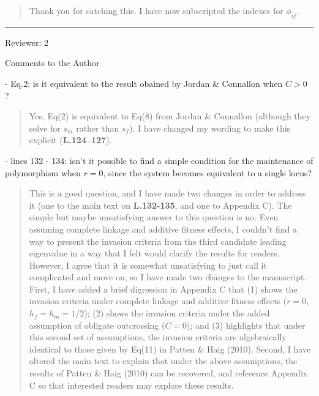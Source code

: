 \documentclass[11pt]{article}
\begin{document}
	\begin{quote}
		Thank you for catching this. I have now subscripted the indexes for $\phi_{ij}$.
	\end{quote}



\bigskip
\noindent \rule{8cm}{0.4pt}
\bigskip



\noindent Reviewer: 2
\bigskip

\noindent Comments to the Author
\bigskip

 - Eq.2: is it equivalent to the result obained by Jordan \& Connallon when $C > 0$ ?

	\begin{quote}
		Yes, Eq(2) is equivalent to Eq(8) from Jordan \& Connallon (although they solve for $s_m$ rather than $s_f$). I have changed my wording to make this explicit (\textbf{L.124--127}).
	\end{quote}

 - lines 132 - 134: isn't it possible to find a simple condition for the maintenance of polymorphism when $r=0$, since the system becomes equivalent to a single locus?

	\begin{quote}
		This is a good question, and I have made two changes in order to address it (one to the main text on \textbf{L.132-135}, and one to Appendix C). The simple but maybe unsatisfying answer to this question is no. Even assuming complete linkage and additive fitness effects, I couldn't find a way to present the invasion criteria from the third candidate leading eigenvalue in a way that I felt would clarify the results for readers. However, I agree that it is somewhat unsatisfying to just call it complicated and move on, so I have made two changes to the manuscript. First, I have added a brief digression in Appendix C that (1) shows the invasion criteria under complete linkage and additive fitness effects ($r=0$, $h_f=h_m=1/2$); (2) shows the invasion criteria under the added assumption of obligate outcrossing ($C=0$); and (3) highlights that under this second set of assumptions, the invasion criteria are algebraically identical to those given by Eq(11) in Patten \& Haig (2010). Second, I have altered the main text to explain that under the above assumptions, the results of Patten \& Haig (2010) can be recovered, and reference Appendix C so that interested readers may explore these results.
	\end{quote}
\end{document}
